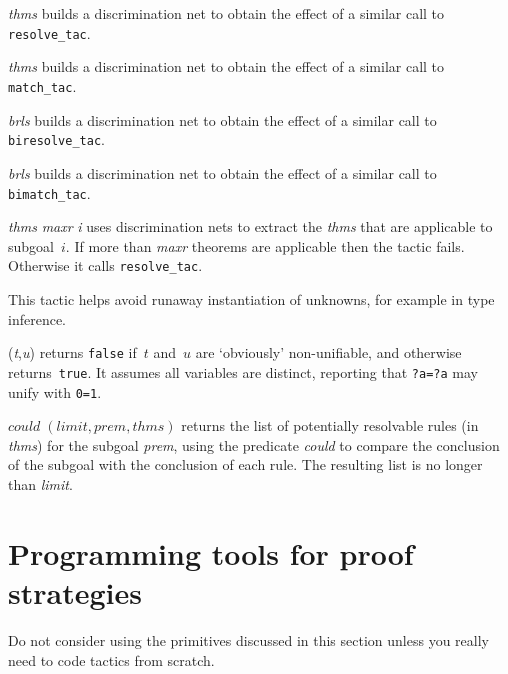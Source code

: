 \begin{ttdescription}
\item[\ttindexbold{net_resolve_tac} {\it thms}] 
builds a discrimination net to obtain the effect of a similar call to {\tt
resolve_tac}.

\item[\ttindexbold{net_match_tac} {\it thms}] 
builds a discrimination net to obtain the effect of a similar call to {\tt
match_tac}.

\item[\ttindexbold{net_biresolve_tac} {\it brls}] 
builds a discrimination net to obtain the effect of a similar call to {\tt
biresolve_tac}.

\item[\ttindexbold{net_bimatch_tac} {\it brls}] 
builds a discrimination net to obtain the effect of a similar call to {\tt
bimatch_tac}.

\item[\ttindexbold{filt_resolve_tac} {\it thms} {\it maxr} {\it i}] 
uses discrimination nets to extract the {\it thms} that are applicable to
subgoal~$i$.  If more than {\it maxr\/} theorems are applicable then the
tactic fails.  Otherwise it calls {\tt resolve_tac}.  

This tactic helps avoid runaway instantiation of unknowns, for example in
type inference.

\item[\ttindexbold{could_unify} ({\it t},{\it u})] 
returns {\tt false} if~$t$ and~$u$ are `obviously' non-unifiable, and
otherwise returns~{\tt true}.  It assumes all variables are distinct,
reporting that {\tt ?a=?a} may unify with {\tt 0=1}.

\item[\ttindexbold{filter_thms} $could\; (limit,prem,thms)$] 
returns the list of potentially resolvable rules (in {\it thms\/}) for the
subgoal {\it prem}, using the predicate {\it could\/} to compare the
conclusion of the subgoal with the conclusion of each rule.  The resulting list
is no longer than {\it limit}.
\end{ttdescription}


\section{Programming tools for proof strategies}
Do not consider using the primitives discussed in this section unless you
really need to code tactics from scratch.

